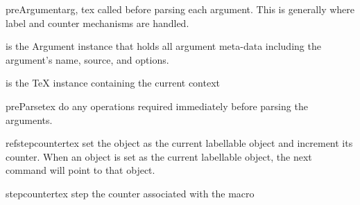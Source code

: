 \begin{methoddesc}[Macro]{preArgument}{arg, tex}
called before parsing each argument.  This is generally where label and
counter mechanisms are handled.

 is the Argument instance that holds all argument meta-data
    including the argument's name, source, and options.

 is the TeX instance containing the current context 
\end{methoddesc}

\begin{methoddesc}[Macro]{preParse}{tex}
do any operations required immediately before parsing the arguments.
\end{methoddesc}

\begin{methoddesc}[Macro]{refstepcounter}{tex}
set the object as the current labellable object and increment its counter.
When an object is set as the current labellable object, the next 
 command will point to that object.
\end{methoddesc}

\begin{methoddesc}[Macro]{stepcounter}{tex}
step the counter associated with the macro
\end{methoddesc}
